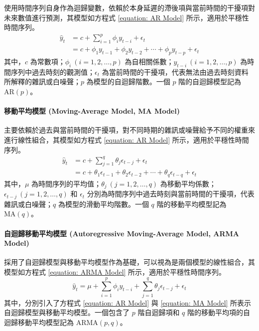 使用時間序列自身作為迴歸變數，依賴於本身延遲的滯後項與當前時間的干擾項對未來數值進行預測，其模型如方程式 \eqref{equation: AR Model} 所示，適用於平穩性時間序列。
%
\begin{equation}\label{equation: AR Model}
  \begin{split}
    \hat{y}_{t} & = c + \sum_{i = 1}^{p} \phi_{i} y_{t-i} + \epsilon_{t} \\
    & = c + \phi_{1} y_{t-1} + \phi_{2} y_{t-2} + \cdots + \phi_{p} y_{t-p} + \epsilon_{t}
  \end{split}
\end{equation}
%
其中，$c$ 為常數項；$\phi_i~(i = 1, 2, \ldots, p)$ 為自相關係數；$y_{t - i}~(i = 1, 2, \ldots, p)$ 為時間序列中過去時刻的觀測值；$\epsilon_t$ 為當前時間的干擾項，代表無法由過去時刻資料所解釋的雜訊或白噪聲；$p$ 為模型的自迴歸階數。一個 $p$ 階的自迴歸模型記為 $\text{AR} (p)$。

\paragraph{移動平均模型 (Moving-Average Model, MA Model)}

主要依賴於過去與當前時間的干擾項，對不同時期的雜訊或噪聲給予不同的權重來進行線性組合，其模型如方程式 \eqref{equation: AR Model} 所示，適用於平穩性時間序列。
%
\begin{equation}\label{equation: MA Model}
  \begin{split}
    \hat{y}_{t} & = c + \sum_{j = 1}^{q} \theta_{j} \epsilon_{t-j} + \epsilon_{t} \\
    & = c + \theta_{1} \epsilon_{t-1} + \theta_{2} \epsilon_{t-2} + \cdots + \theta_{q} \epsilon_{t-q} + \epsilon_{t}
  \end{split}
\end{equation}
%
其中，$\mu$ 為時間序列的平均值；$\theta_{j}~(j = 1, 2, \ldots, q)$ 為移動平均係數；$\epsilon_{t - j}~(j = 1, 2, \ldots, q)$ 和 $\epsilon_t$ 分別為時間序列中過去時刻與當前時間的干擾項，代表雜訊或白噪聲；$q$ 為模型的滑動平均階數。一個 $q$ 階的移動平均模型記為 $\text{MA} (q)$。

\paragraph{自迴歸移動平均模型 (Autoregressive Moving-Average Model, ARMA Model)}

採用了自迴歸模型與移動平均模型作為基礎，可以視為是兩個模型的線性組合，其模型如方程式 \eqref{equation: ARMA Model} 所示，適用於平穩性時間序列。
%
\begin{equation}\label{equation: ARMA Model}
  \hat{y}_{t} = \mu + \sum_{i = 1}^{p} \phi_{i} y_{t-i} + \sum_{j = 1}^{q} \theta_{j} \epsilon_{t-j} + \epsilon_{t}
\end{equation}
%
其中，分別引入了方程式 \eqref{equation: AR Model} 與 \eqref{equation: MA Model} 所表示自迴歸模型與移動平均模型。一個包含了 $p$ 階自迴歸項和 $q$ 階的移動平均項的自迴歸移動平均模型記為 $\text{ARMA} (p, q)$。

